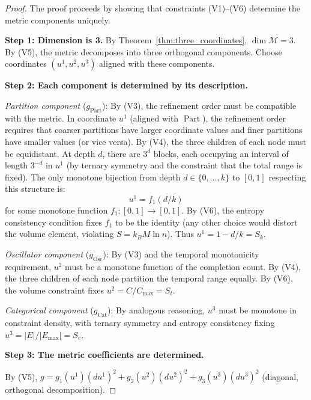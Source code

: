 \documentclass[12pt,twocolumn]{article}
\DeclareMathOperator{\Cat}{Cat}
\DeclareMathOperator{\Part}{Part}
\DeclareMathOperator{\Osc}{Osc}
\begin{document}
\begin{proof}
The proof proceeds by showing that constraints (V1)--(V6) determine the metric components uniquely.

\textbf{Step 1: Dimension is 3.} By Theorem~\ref{thm:three_coordinates}, $\dim \mathcal{M} = 3$. By (V5), the metric decomposes into three orthogonal components. Choose coordinates $(u^1, u^2, u^3)$ aligned with these components.

\textbf{Step 2: Each component is determined by its description.}

\emph{Partition component} ($g_{\Part}$): By (V3), the refinement order must be compatible with the metric. In coordinate $u^1$ (aligned with $\Part$), the refinement order requires that coarser partitions have larger coordinate values and finer partitions have smaller values (or vice versa). By (V4), the three children of each node must be equidistant. At depth $d$, there are $3^d$ blocks, each occupying an interval of length $3^{-d}$ in $u^1$ (by ternary symmetry and the constraint that the total range is fixed). The only monotone bijection from depth $d \in \{0, \ldots, k\}$ to $[0,1]$ respecting this structure is:
\begin{equation}
u^1 = f_1(d/k)
\end{equation}
for some monotone function $f_1: [0,1] \to [0,1]$. By (V6), the entropy consistency condition fixes $f_1$ to be the identity (any other choice would distort the volume element, violating $S = k_B M \ln n$). Thus $u^1 = 1 - d/k = S_k$.

\emph{Oscillator component} ($g_{\Osc}$): By (V3) and the temporal monotonicity requirement, $u^2$ must be a monotone function of the completion count. By (V4), the three children of each node partition the temporal range equally. By (V6), the volume constraint fixes $u^2 = C/C_{\max} = S_t$.

\emph{Categorical component} ($g_{\Cat}$): By analogous reasoning, $u^3$ must be monotone in constraint density, with ternary symmetry and entropy consistency fixing $u^3 = |E|/|E_{\max}| = S_e$.

\textbf{Step 3: The metric coefficients are determined.}

By (V5), $g = g_1(u^1)(du^1)^2 + g_2(u^2)(du^2)^2 + g_3(u^3)(du^3)^2$ (diagonal, orthogonal decomposition).


\end{proof}
\end{document}
